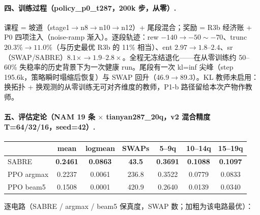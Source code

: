 \paragraph{四、训练过程（policy\_p0\_t287，200k 步，从零）.}
课程 = 坡道（stage1$\to$n8$\to$n10$\to$n12）+ 尾段混合；奖励 = R3b 经济账 + P0 四项注入（noise-ramp 渐入）。逐段轨迹：rew $-140\to-50\sim-70$、trunc $20.3\%\to11.0\%$（与历史最优 R3b 的 11\% 相当）、ent $2.97\to1.8\text{--}2.4$、sr（SWAP/SABRE）$8.1\times\to1.9\text{--}2.8\times$。全程无冻结退化——在从零训练约 50--60\% 失稳率的历史背景下为一次健康 run。尾段有一次 kl=inf 尖峰（step 195.6k，策略瞬时塌缩后恢复）与 SWAP 回升（46.9$\to$89.3）。KL 教师未启用：换拓扑 + 换观测的从零训练无可对齐维度的教师，P1-b 路径留给本次产物作教师。

\paragraph{五、评估定论（NAM 19 条 $\times$ tianyan287\_20q，v2 混合精度 T=64/32/16，seed=42）.}
\begin{table}[htbp]
\centering
\small
\begin{tabular}{l|ccc|ccc}
\hline
 & mean & logmean & SWAPs & 5--9q & 10--14q & 15--19q \\
\hline
SABRE & \textbf{0.2461} & \textbf{0.0863} & \textbf{43.5} & \textbf{0.3691} & \textbf{0.1088} & \textbf{0.1097} \\
PPO argmax & 0.2237 & 0.0061 & 236.8 & 0.3522 & 0.0779 & 0.0833 \\
PPO beam5 & 0.1508 & 0.0001 & 420.9 & 0.2640 & 0.0139 & 0.0340 \\
\hline
\end{tabular}
\end{table}
逐电路（SABRE / argmax / beam5 保真度，SWAP 数；加粗为该电路最优）：
